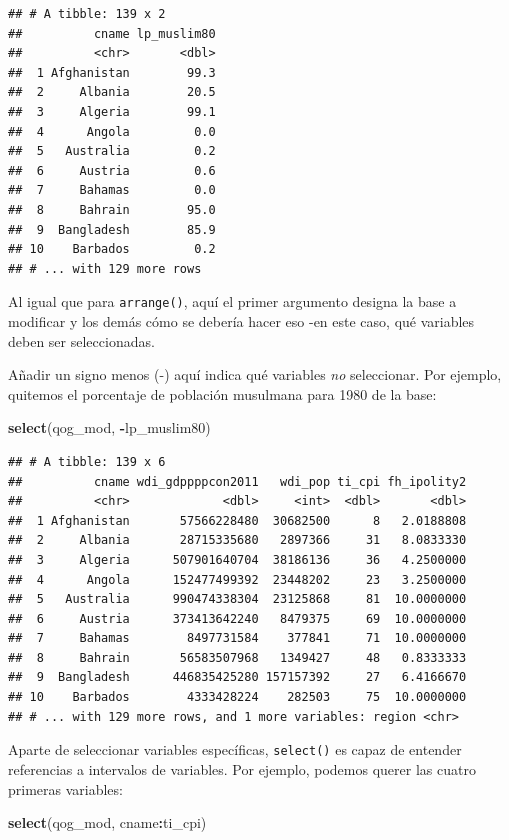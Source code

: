 \documentclass[]{book}
\newenvironment{Shaded}{\begin{snugshade}}{\end{snugshade}}
\newcommand{\KeywordTok}[1]{\textcolor[rgb]{0.13,0.29,0.53}{\textbf{#1}}}
\newcommand{\OperatorTok}[1]{\textcolor[rgb]{0.81,0.36,0.00}{\textbf{#1}}}
\newcommand{\NormalTok}[1]{#1}
\begin{document}
\begin{verbatim}
## # A tibble: 139 x 2
##          cname lp_muslim80
##          <chr>       <dbl>
##  1 Afghanistan        99.3
##  2     Albania        20.5
##  3     Algeria        99.1
##  4      Angola         0.0
##  5   Australia         0.2
##  6     Austria         0.6
##  7     Bahamas         0.0
##  8     Bahrain        95.0
##  9  Bangladesh        85.9
## 10    Barbados         0.2
## # ... with 129 more rows
\end{verbatim}

Al igual que para \texttt{arrange()}, aquí el primer argumento designa
la base a modificar y los demás cómo se debería hacer eso -en este caso,
qué variables deben ser seleccionadas.

Añadir un signo menos (-) aquí indica qué variables \emph{no}
seleccionar. Por ejemplo, quitemos el porcentaje de población musulmana
para 1980 de la base:

\begin{Shaded}
\begin{Highlighting}[]
\KeywordTok{select}\NormalTok{(qog_mod, }\OperatorTok{-}\NormalTok{lp_muslim80)}
\end{Highlighting}
\end{Shaded}

\begin{verbatim}
## # A tibble: 139 x 6
##          cname wdi_gdppppcon2011   wdi_pop ti_cpi fh_ipolity2
##          <chr>             <dbl>     <int>  <dbl>       <dbl>
##  1 Afghanistan       57566228480  30682500      8   2.0188808
##  2     Albania       28715335680   2897366     31   8.0833330
##  3     Algeria      507901640704  38186136     36   4.2500000
##  4      Angola      152477499392  23448202     23   3.2500000
##  5   Australia      990474338304  23125868     81  10.0000000
##  6     Austria      373413642240   8479375     69  10.0000000
##  7     Bahamas        8497731584    377841     71  10.0000000
##  8     Bahrain       56583507968   1349427     48   0.8333333
##  9  Bangladesh      446835425280 157157392     27   6.4166670
## 10    Barbados        4333428224    282503     75  10.0000000
## # ... with 129 more rows, and 1 more variables: region <chr>
\end{verbatim}

Aparte de seleccionar variables específicas, \texttt{select()} es capaz
de entender referencias a intervalos de variables. Por ejemplo, podemos
querer las cuatro primeras variables:

\begin{Shaded}
\begin{Highlighting}[]
\KeywordTok{select}\NormalTok{(qog_mod, cname}\OperatorTok{:}\NormalTok{ti_cpi)}
\end{Highlighting}
\end{Shaded}
\end{document}
